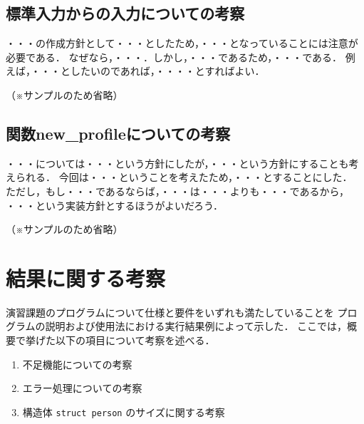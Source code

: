 \documentclass[a4j,11pt]{jarticle}
\begin{document}
\subsection{標準入力からの入力についての考察}

・・・の作成方針として・・・としたため，・・・となっていることには注意が必要である．
なぜなら，・・・．しかし，・・・であるため，・・・である．
例えば，・・・としたいのであれば，・・・・とすればよい．

（※サンプルのため省略）

\subsection{関数new\_profileについての考察}

・・・については・・・という方針にしたが，・・・という方針にすることも考えられる．
今回は・・・ということを考えたため，・・・とすることにした．
ただし，もし・・・であるならば，・・・は・・・よりも・・・であるから，
・・・という実装方針とするほうがよいだろう．

（※サンプルのため省略）


\section{結果に関する考察}


演習課題のプログラムについて仕様と要件をいずれも満たしていることを
プログラムの説明および使用法における実行結果例によって示した．
ここでは，概要で挙げた以下の項目について考察を述べる．

\begin{enumerate}
\setlength{\parskip}{2pt} \setlength{\itemsep}{2pt}
    \item 不足機能についての考察
    \item エラー処理についての考察
    \item 構造体 \verb|struct person| のサイズに関する考察
\end{enumerate}
\end{document}
